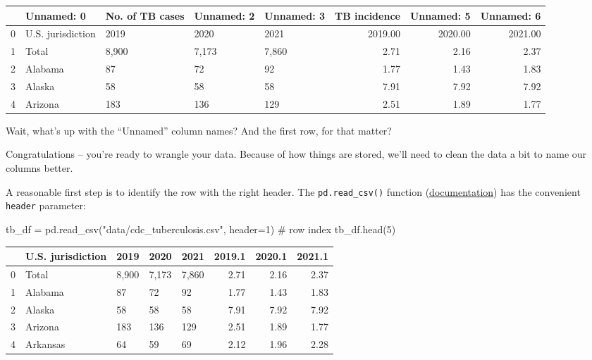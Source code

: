 \documentclass[
  letterpaper,
  DIV=11,
  numbers=noendperiod]{scrreprt}
\newenvironment{Shaded}{\begin{snugshade}}{\end{snugshade}}
\newcommand{\CommentTok}[1]{\textcolor[rgb]{0.37,0.37,0.37}{#1}}
\newcommand{\DecValTok}[1]{\textcolor[rgb]{0.68,0.00,0.00}{#1}}
\newcommand{\NormalTok}[1]{\textcolor[rgb]{0.00,0.23,0.31}{#1}}
\newcommand{\OperatorTok}[1]{\textcolor[rgb]{0.37,0.37,0.37}{#1}}
\newcommand{\StringTok}[1]{\textcolor[rgb]{0.13,0.47,0.30}{#1}}
\begin{document}
\begin{tabular}{lllllrrr}
\toprule
{} &         Unnamed: 0 & No. of TB cases & Unnamed: 2 & Unnamed: 3 &  TB incidence &  Unnamed: 5 &  Unnamed: 6 \\
\midrule
0 &  U.S. jurisdiction &            2019 &       2020 &       2021 &       2019.00 &     2020.00 &     2021.00 \\
1 &              Total &           8,900 &      7,173 &      7,860 &          2.71 &        2.16 &        2.37 \\
2 &            Alabama &              87 &         72 &         92 &          1.77 &        1.43 &        1.83 \\
3 &             Alaska &              58 &         58 &         58 &          7.91 &        7.92 &        7.92 \\
4 &            Arizona &             183 &        136 &        129 &          2.51 &        1.89 &        1.77 \\
\bottomrule
\end{tabular}

Wait, what's up with the ``Unnamed'' column names? And the first row,
for that matter?

Congratulations -- you're ready to wrangle your data. Because of how
things are stored, we'll need to clean the data a bit to name our
columns better.

A reasonable first step is to identify the row with the right header.
The \texttt{pd.read\_csv()} function
(\href{https://pandas.pydata.org/docs/reference/api/pandas.read_csv.html}{documentation})
has the convenient \texttt{header} parameter:

\begin{Shaded}
\begin{Highlighting}[]
\NormalTok{tb\_df }\OperatorTok{=}\NormalTok{ pd.read\_csv(}\StringTok{"data/cdc\_tuberculosis.csv"}\NormalTok{, header}\OperatorTok{=}\DecValTok{1}\NormalTok{) }\CommentTok{\# row index}
\NormalTok{tb\_df.head(}\DecValTok{5}\NormalTok{)}
\end{Highlighting}
\end{Shaded}

\begin{tabular}{lllllrrr}
\toprule
{} & U.S. jurisdiction &   2019 &   2020 &   2021 &  2019.1 &  2020.1 &  2021.1 \\
\midrule
0 &             Total &  8,900 &  7,173 &  7,860 &    2.71 &    2.16 &    2.37 \\
1 &           Alabama &     87 &     72 &     92 &    1.77 &    1.43 &    1.83 \\
2 &            Alaska &     58 &     58 &     58 &    7.91 &    7.92 &    7.92 \\
3 &           Arizona &    183 &    136 &    129 &    2.51 &    1.89 &    1.77 \\
4 &          Arkansas &     64 &     59 &     69 &    2.12 &    1.96 &    2.28 \\
\bottomrule
\end{tabular}
\end{document}
